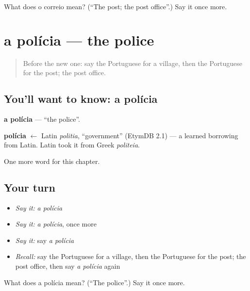 \begin{tcolorbox}[breakable,colback=teal!4,colframe=teal!35!black,title={Before you move on}]
What does o correio mean? (\textquotedblleft{}The post; the post office\textquotedblright{}.) Say it once more.
\end{tcolorbox}
\section[a polícia]{a polícia — the police}

\label{lesson:PT-C76-policia}



\begin{quote}
Before the new one: say the Portuguese for a village, then the Portuguese for the post; the post office.
\end{quote}

\subsection*{You'll want to know: a polícia}
\textbf{a polícia} — \textquotedblleft{}the police\textquotedblright{}.

\begin{cousinweb}
\textbf{polícia} $\leftarrow$ Latin \emph{politia}, \textquotedblleft{}government\textquotedblright{} (EtymDB 2.1) — a learned borrowing from Latin. Latin took it from Greek \emph{politeia}.
\end{cousinweb}

\begin{grammarlens}[title={What you've built}]
One more word for this chapter.
\end{grammarlens}

\subsection*{Your turn}
\begin{itemize}
\raggedright
  \item \emph{Say it:} \emph{a polícia}
  \item \emph{Say it:} \emph{a polícia}, once more
  \item \emph{Say it:} say \emph{a polícia}
  \item \emph{Recall:} say the Portuguese for a village, then the Portuguese for the post; the post office, then say \emph{a polícia} again
\end{itemize}

\begin{tcolorbox}[breakable,colback=teal!4,colframe=teal!35!black,title={Before you move on}]
What does a polícia mean? (\textquotedblleft{}The police\textquotedblright{}.) Say it once more.
\end{tcolorbox}
